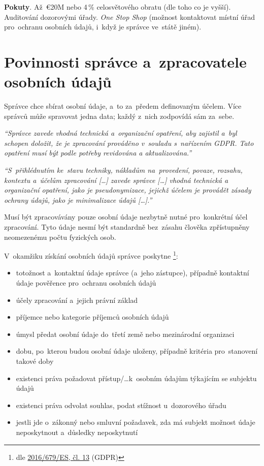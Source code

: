 \textbf{Pokuty}. Až~€20M nebo 4\,\% celosvětového obratu (dle toho co je vyšší). Auditování dozorovými úřady. \emph{One Stop Shop} (možnost kontaktovat místní úřad pro~ochranu osobních údajů, i~když je správce ve~státě jiném).

\clearpage
\section{Povinnosti správce a~zpracovatele osobních údajů}
\label{question-7}

Správce chce sbírat osobní údaje, a~to za~předem definovaným účelem. Více správců může spravovat jedna data; každý z~nich zodpovídá sám za~sebe.

\emph{\enquote{Správce zavede vhodná technická a~organizační opatření, aby zajistil a~byl schopen doložit, že je zpracování prováděno v~souladu s~nařízením GDPR. Tato opatření musí být podle potřeby revidována a aktualizována.}}

\emph{\enquote{S~přihlédnutím ke~stavu techniky, nákladům na~provedení, povaze, rozsahu, kontextu a~účelům zpracování [\dots] zavede správce [\dots] vhodná technická a organizační opatření, jako je pseudonymizace, jejichž účelem je provádět zásady ochrany údajů, jako je minimalizace údajů [\dots].}}

Musí být zpracovávány pouze osobní údaje nezbytně nutné pro~konkrétní účel zpracování. Tyto údaje nesmí být standardně bez~zásahu člověka zpřístupněny neomezenému počtu fyzických osob.

\vspace*{1em}

V~okamžiku získání osobních údajů správce poskytne%
\footnote{%
	dle \href{https://eur-lex.europa.eu/legal-content/CS/TXT/HTML/?uri=CELEX:32016R0679\#d1e2243-1-1}{2016/679/ES, čl. 13}  (GDPR)%
}:

\begin{itemize}
\item totožnost a~kontaktní údaje správce (a~jeho zástupce), případně kontaktní údaje pověřence pro~ochranu osobních údajů
\item účely zpracování a~jejich právní základ
\item příjemce nebo kategorie příjemců osobních údajů
\item úmysl předat osobní údaje do~třetí země nebo mezinárodní organizaci
\item dobu, po~kterou budou osobní údaje uloženy, případně kritéria pro~stanovení takové doby
\item existenci práva požadovat přístup/\dots k~osobním údajům týkajícím se subjektu údajů
\item existenci práva odvolat souhlas, podat stížnost u~dozorového úřadu
\item jestli jde o~zákonný nebo smluvní požadavek, zda má subjekt možnost údaje neposkytnout a~důsledky neposkytnutí
\end{itemize}

